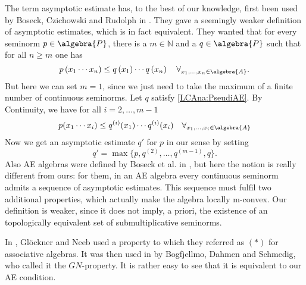 \begin{remark}
	\label{LCAna:Rem:AE1}
	\mbox{}
	\begin{remarklist}
		\item
		The term asymptotic estimate has, to the best of our knowledge, 
		first been used by Boseck, Czichowski and Rudolph in 
		\cite{boseck.czichowski.rudolph:1981a}. They gave a seemingly weaker
		definition of asymptotic estimates, which is in fact equivalent.
		They wanted that for every seminorm $p\in \algebra{P}$, there is a 
		$m \in \mathbb{N}$ and a $q \in \algebra{P}$ such that for all 
		$n \geq m$ one has
		\begin{equation}
			\label{LCAna:PseudiAE}
			p \left( x_1 \cdots x_n \right)
			\leq
			q \left(x_1\right) \cdots q \left(x_n\right)
			\quad
			\forall_{x_1, \ldots, x_n \in \algebra{A}}.
		\end{equation}
		But here we can set $m = 1$, since we just need to take the maximum of 
		a finite number of continuous seminorms. Let $q$ satisfy 
		\eqref{LCAna:PseudiAE}. By Continuity, we have for all 
		$i = 2, \ldots, m-1$
		\begin{equation*}
		 	p(x_1 \cdots x_i)
		 	\leq
		 	q^{(i)}(x_1) \cdots q^{(i)}(x_i)
		 	\quad
		 	\forall_{x_1, \ldots, x_i \in \algebra{A}}
		\end{equation*}
		Now we get an asymptotic estimate $q'$ for $p$ in our sense by setting
		\begin{equation*}
		 	q'
		 	=
		 	\max\{ 
		 		p, q^{(2)}, \ldots, q^{(m-1)}, q
		 	\}.
		\end{equation*}
		Also AE algebras were defined by Boseck et al. in 
		\cite{boseck.czichowski.rudolph:1981a}, but here the notion is really 
		different from ours: for them, in an AE algebra every continuous 
		seminorm admits a sequence of asymptotic estimates. This sequence must 
		fulfil two additional properties, which actually make the algebra 
		locally 	m-convex. Our definition is weaker,	since it does not imply, 
		a priori, the existence of an topologically equivalent set of 
		submultiplicative seminorms.
		
		\item
		In \cite{gloeckner.neeb:2012a}, Gl\"ockner and Neeb used a property to 
		which they referred as $(*)$ for associative algebras. It was then 
		used in 	\cite{bogfjellmo.dahmen.schmedig:2015a} by Bogfjellmo, Dahmen 
		and Schmedig, who called it the $GN$-property. It is rather easy to 
		see that it is equivalent to our AE condition. 
	\end{remarklist}
\end{remark}

